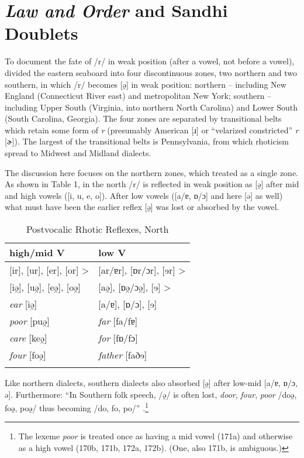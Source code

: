 \documentclass[output=paper,
modfonts
]{LSP/langsci}
\begin{document}
\section{\emph{Law and Order} and Sandhi
Doublets}

To document the fate of /r/ in weak position (after a vowel, not before
a vowel), \citet{KUR} divided the eastern seaboard into
four discontinuous zones, two northern and two southern, in which /r/
becomes {[}ə̯{]} in weak position: northern -- including New England
(Connecticut River east) and metropolitan New York; southern -- including
Upper South (Virginia, into northern North Carolina) and Lower South
(South Carolina, Georgia). The four zones are separated by transitional
belts which retain some form of \emph{r} (presumably American {[}ɹ{]} or
``velarized constricted'' \emph{r} {[}ɚ{]}). The largest of the
transitional belts is Pennsylvania, from which rhoticism spread to
Midwest and Midland dialects.

The discussion here focuses on the northern zones, which \citet{KUR} treated as a single zone. As shown in Table 1, in the north /r/
is reflected in weak position as {[}ə̯{]} after mid and high vowels
({[}i, u, e, o{]}). After low vowels ({[}a/ɐ, ɒ/ɔ{]} and here {[}ə{]} as
well) what must have been the earlier reflex {[}ə̯{]} was lost or
absorbed by the vowel.

\begin{table}[ht]
\centering\caption{Postvocalic Rhotic Reflexes, North}
\begin{tabular}{ll}
\lsptoprule
high/mid V & low V\\
\midrule
{[}ir{]}, {[}ur{]}, {[}er{]}, {[}or{]} \textgreater{} &  [ar/ɐr], [ɒr/ɔr], [ɘr]
\textgreater{}\\
{[}iə̯{]}, {[}uə̯{]}, {[}eə̯{]}, {[}oə̯{]} & {[}aə̯{]}, {[}ɒə̯/ɔə̯{]}, {[}ɘ{]}
\textgreater{}\\
\emph{ear} {[}iə̯{]} & [a/ɐ], [ɒ/ɔ], [ɘ] \\
\emph{poor} {[}puə̯{]} & \emph{far} {[}fa/fɐ{]}\\
\emph{care} {[}keə̯{]} & \emph{for} {[}fɒ/fɔ{]}\\
\emph{four} {[}foə̯{]} & \emph{father} [faðɘ]\\
\lspbottomrule
\end{tabular}
\end{table}

Like northern dialects, southern dialects also absorbed {[}ə̯{]} after
low-mid [a/ɐ, ɒ/ɔ, ə]. Furthermore: ``In Southern folk speech, /ə̯/
is often lost, \emph{door}, \emph{four}, \emph{poor} /doə̯, foə̯, poə̯/
thus becoming /do, fo, po/'' \citep[171a and map \#156]{KUR}.\footnote{The
  lexeme \emph{poor} is treated once as having a mid vowel (171a) and
  otherwise as a high vowel (170b, 171b, 172a, 172b). (One, also 171b,
  is ambiguous.)}
\end{document}

